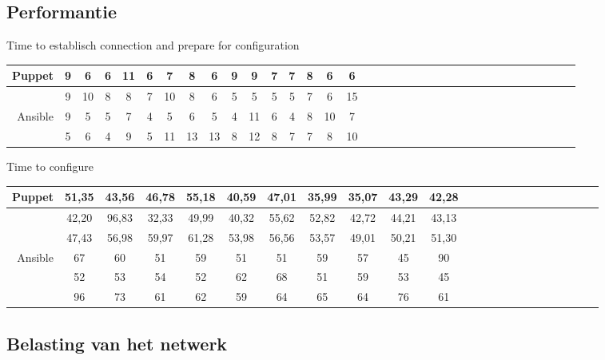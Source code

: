 \subsection{Performantie}
  Time to establisch connection and prepare for configuration \newline
\begin{tabular}{| r |c |c |c |c |c |c |c |c |c |c |c |c |c |c |c |c |c |c |c |c |c |c |c |c |c |c |c |c |c |c |c |c |c |c |}
  \hline	  		
Puppet & 9 & 6 & 6 & 11 & 6 & 7 & 8 & 6 & 9 & 9 & 7 & 7 & 8 & 6 & 6   \\ 
\hline
& 9 & 10 & 8 & 8 & 7 & 10 & 8 & 6 & 5 & 5 & 5 & 5 & 7 & 6 & 15\\
   \hline    \hline
  Ansible & 9 & 5 & 5 & 7 & 4 & 5 & 6 & 5 & 4 & 11 & 6 & 4 & 8 & 10 & 7 \\ 
\hline
   & 5 & 6 & 4 & 9 & 5 & 11 & 13 & 13 & 8 & 12 & 8 &	7 & 7 & 8  & 10 \\
  \hline  
\end{tabular}


Time to configure

\begin{tabular}{| r |c |c |c |c |c |c |c |c |c |c |c |c |c |c |c |c |c |c |c |c | c c |}
  \hline			
  
Puppet & 51,35 & 43,56 & 46,78 & 55,18 & 40,59 & 47,01 & 35,99 & 35,07 & 43,29 & 42,28  \\ \hline
           & 42,20 & 96,83 & 32,33 & 49,99 & 40,32 & 55,62 & 52,82 & 42,72 & 44,21 & 43,13 \\ \hline
            & 47,43 & 56,98	& 59,97 & 61,28 & 53,98	& 56,56 & 53,57 & 49,01 & 50,21 & 51,30 \\ \hline
              \hline 
   
  Ansible & 67 & 60 & 51 & 59 & 51 & 51 & 59 & 57 & 45 & 90 \\ \hline
                & 52  & 53 & 54 & 52 & 62 & 68 & 51 & 59 & 53 & 45  \\ \hline
                & 96 & 73 & 61 & 62	& 59 & 64	& 65 & 64 & 76 & 61  \\ \hline
                
  \hline  
\end{tabular}

\subsection{Belasting van het netwerk}

